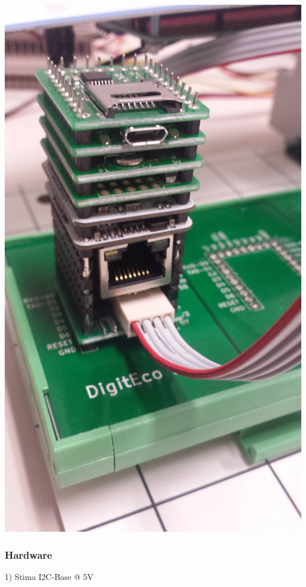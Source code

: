 \begin{DoxyImageNoCaption}
  \mbox{\includegraphics[width=\textwidth,height=\textheight/2,keepaspectratio=true]{ethernet.jpg}}
\end{DoxyImageNoCaption}
\hypertarget{index_stima_ethernet_hardware}{}\subsubsection{Hardware}\label{index_stima_ethernet_hardware}
1) Stima I2\+C-\/\+Base @ 5V

